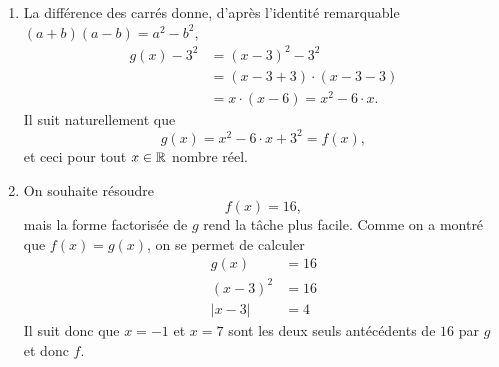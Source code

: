 {\begin{enumerate}
			\item
			La différence des carrés donne, d'après l'identité remarquable $(a+b)(a-b) = a^2 - b^2$, 
				\begin{align*}
					g(x) - 3^2 &= (x-3)^2 - 3^2 \\
								&= (x-3+3) \cdot (x-3-3) \\
								&= x \cdot (x-6) = x^2 - 6\cdot x.
				\end{align*}
			Il suit naturellement que
				\[ g(x) = x^2 - 6\cdot x + 3^2 = f(x), \]
			et ceci pour tout $x\in\mathbb{R}$ nombre réel.
			
			\item
			On souhaite résoudre
				\[ f(x) = 16, \]
			mais la forme factorisée de $g$ rend la tâche plus facile.
			Comme on a montré que $f(x) = g(x)$, on se permet de calculer
				\begin{align*}
					g(x) &= 16 \\
					(x-3)^2 &= 16 \\
					|x-3| &= 4
				\end{align*}
			Il suit donc que $x=-1$ et $x=7$ sont les deux seuls antécédents de $16$ par $g$ et donc $f$.
		\end{enumerate}
	
	}


